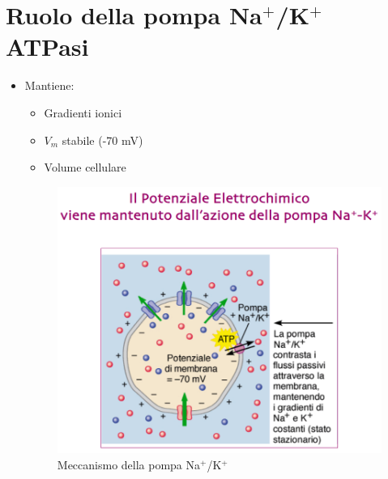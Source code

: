 \documentclass{article}
\begin{document}
\section{Ruolo della pompa Na\(^+\)/K\(^+\) ATPasi}
\begin{itemize}
\item Mantiene:
  \begin{itemize}
  \item Gradienti ionici
  \item \(V_m\) stabile (-70 mV)
  \item Volume cellulare
  \end{itemize}

\begin{figure}[h]
\centering
\includegraphics[width=1\textwidth]{Neuroscienze 2024-2025/Modulo I/Immagini Modulo I/Screenshot 2025-06-21 at 17-45-10 6. Differenza di potenziale e sua misurazione .pdf.png}
\caption{Meccanismo della pompa Na\(^+\)/K\(^+\)}
\label{fig:pompa}
\end{figure}
\end{itemize}
\end{document}

